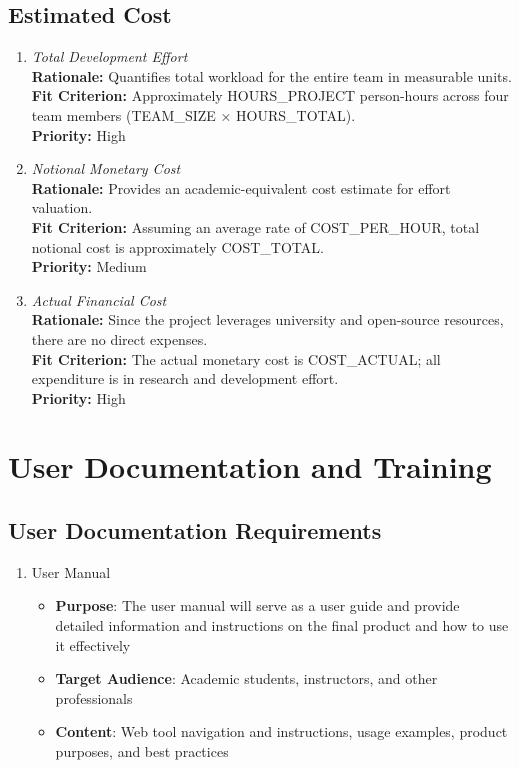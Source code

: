 \documentclass[12pt]{article}
\begin{document}
\subsection{Estimated Cost}
\begin{enumerate}[label=C-EC \arabic*., wide=0pt, leftmargin=*]
\item \emph{Total Development Effort}\\[2mm] 
    {\bf Rationale:} Quantifies total workload for the entire team in measurable units.\\
    {\bf Fit Criterion:} Approximately HOURS\_PROJECT person-hours across four team members (TEAM\_SIZE × HOURS\_TOTAL).\\
    {\bf Priority:} High

\item \emph{Notional Monetary Cost}\\[2mm] 
    {\bf Rationale:} Provides an academic-equivalent cost estimate for effort valuation.\\
    {\bf Fit Criterion:} Assuming an average rate of COST\_PER\_HOUR, total notional cost is approximately COST\_TOTAL.\\
    {\bf Priority:} Medium

\item \emph{Actual Financial Cost}\\[2mm] 
    {\bf Rationale:} Since the project leverages university and open-source resources, there are no direct expenses.\\
    {\bf Fit Criterion:} The actual monetary cost is COST\_ACTUAL; all expenditure is in research and development effort.\\
    {\bf Priority:} High
\end{enumerate}
\section{User Documentation and Training}
\subsection{User Documentation Requirements}
\begin{enumerate}
  \item User Manual
    \begin{itemize}
      \item \textbf{Purpose}: The user manual will serve as a user
        guide and provide detailed information and instructions on
        the final product and how to use it effectively
      \item \textbf{Target Audience}: Academic students, instructors,
        and other professionals
      \item \textbf{Content}: Web tool navigation and instructions,
        usage examples, product purposes, and best practices
    \end{itemize}
\end{enumerate}
\end{document}
